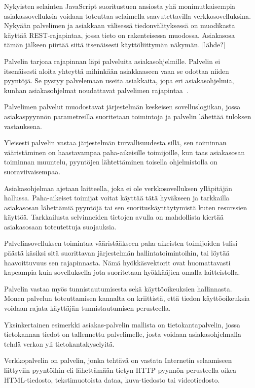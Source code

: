 \documentclass[12pt]{article}
\begin{document}
Nykyisten selainten JavaScript suoritustuen ansiosta yhä
monimutkaisempia asiakassovelluksia voidaan toteuttaa
selaimella saavutettavilla verkkosovelluksina.
Nykyään palvelimen ja asiakkaan
välisessä tiedonvälityksessä on muodikasta käyttää REST-rajapintaa, jossa
tieto on rakenteisessa muodossa. Asiakasosa tämän jälkeen piirtää siitä
itsenäisesti käyttöliittymän näkymän. [lähde?]

Palvelin tarjoaa rajapinnan läpi palveluita asiakasohjelmille.
Palvelin ei itsenäisesti aloita yhteyttä mihinkään
asiakkaaseen vaan se odottaa niiden pyyntöjä.
Se pystyy palvelemaan useita asiakkaita, jopa
eri asiakasohjelmia, kunhan asiakasohjelmat noudattavat
palvelimen rajapintaa~\cite{sinha_client-server_1992}.

Palvelimen palvelut muodostavat järjestelmän keskeisen
sovelluslogiikan, jossa asiakaspyynnön parametreilla
suoritetaan toimintoja ja palvelin lähettää
tuloksen vastauksena.

Yleisesti palvelin vastaa järjestelmän turvallisuudesta sillä,
sen toiminnan vääristäminen on haastavampaa paha-aikeisille
toimijoille, kun taas asiakasosan toiminnan muuntelu, pyyntöjen
lähtettäminen toisella ohjelmistolla on suoraviivaisempaa.

Asiakasohjelmaa ajetaan laitteella, joka ei ole verkkosovelluksen
ylläpitäjän hallussa. Paha-aikeiset toimijat voitat käyttää tätä hyväkseen
ja tarkkailla asiakasosan lähettämiä pyyntöjä tai sen
suorituskäyttäytymistä kuten resurssien käyttöä.
Tarkkailusta selvinneiden tietojen avulla on mahdollista
kiertää asiakasosaan toteutettuja suojauksia.

Palvelinsovelluksen toimintaa vääristääkseen 
paha-aikeisten toimijoiden tulisi päästä
käsiksi sitä suorittavan järjestelmän hallintatoimintoihin, tai
löytää haavoittuvuus sen rajapinnasta. Nämä hyökkäsvektorit
ovat huomattavasti kapeampia kuin sovelluksella jota
suoritetaan hyökkääjien omalla laitteistolla.

Palvelin vastaa myös tunnistautumisesta sekä käyttöoikeuksien hallinnasta.
Monen palvelun toteuttamisen kannalta on kriittistä, että
tiedon käyttöoikeuksia voidaan rajata käyttäjän tunnistautumisen perusteella.

Yksinkertainen esimerkki asiakas-palvelin mallista on tietokantapalvelin,
jossa tietokannan tiedot on tallennettu palvelimelle, josta voidaan
asiakasohjelmalla tehdä verkon yli tietokantakyselyitä.

Verkkopalvelin on palvelin, jonka tehtävä on vastata Internetin
selaamiseen liittyviin pyyntöihin eli lähettämään tietyn HTTP-pyynnön
perusteella oikea HTML-tiedosto, tekstimuotoista dataa, kuva-tiedosto
tai videotiedosto.
\end{document}
